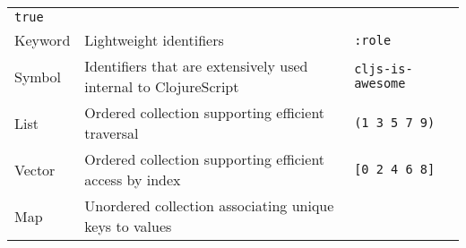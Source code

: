 \documentclass[10pt,twoside,openright]{memoir}
\begin{document}
\begin{longtable}[]{@{}lll@{}}
\begin{minipage}[t]{0.33\columnwidth}
\texttt{true}\strut
\end{minipage}\tabularnewline
\begin{minipage}[t]{0.07\columnwidth}\raggedright
Keyword\strut
\end{minipage} & \begin{minipage}[t]{0.51\columnwidth}\raggedright
Lightweight identifiers\strut
\end{minipage} & \begin{minipage}[t]{0.33\columnwidth}\raggedright
\texttt{:role}\strut
\end{minipage}\tabularnewline
\begin{minipage}[t]{0.07\columnwidth}\raggedright
Symbol\strut
\end{minipage} & \begin{minipage}[t]{0.51\columnwidth}\raggedright
Identifiers that are extensively used internal to ClojureScript\strut
\end{minipage} & \begin{minipage}[t]{0.33\columnwidth}\raggedright
\texttt{\textquotesingle{}cljs-is-awesome}\strut
\end{minipage}\tabularnewline
\begin{minipage}[t]{0.07\columnwidth}\raggedright
List\strut
\end{minipage} & \begin{minipage}[t]{0.51\columnwidth}\raggedright
Ordered collection supporting efficient traversal\strut
\end{minipage} & \begin{minipage}[t]{0.33\columnwidth}\raggedright
\texttt{\textquotesingle{}(1\ 3\ 5\ 7\ 9)}\strut
\end{minipage}\tabularnewline
\begin{minipage}[t]{0.07\columnwidth}\raggedright
Vector\strut
\end{minipage} & \begin{minipage}[t]{0.51\columnwidth}\raggedright
Ordered collection supporting efficient access by index\strut
\end{minipage} & \begin{minipage}[t]{0.33\columnwidth}\raggedright
\texttt{{[}0\ 2\ 4\ 6\ 8{]}}\strut
\end{minipage}\tabularnewline
\begin{minipage}[t]{0.07\columnwidth}\raggedright
Map\strut
\end{minipage} & \begin{minipage}[t]{0.51\columnwidth}\raggedright
Unordered collection associating unique keys to values\strut

\end{minipage}
\end{longtable}
\end{document}
